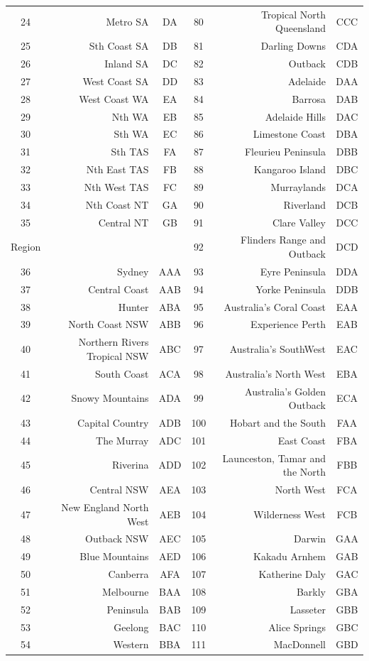 \documentclass[11pt,a4paper,]{article}
\begin{document}
\begin{table}
\begin{tabular}[t]{crccrc}
24 & Metro SA & DA & 80 & Tropical North Queensland & CCC\\
25 & Sth Coast SA & DB & 81 & Darling Downs & CDA\\
26 & Inland SA & DC & 82 & Outback & CDB\\
27 & West Coast SA & DD & 83 & Adelaide & DAA\\
28 & West Coast WA & EA & 84 & Barrosa & DAB\\
29 & Nth WA & EB & 85 & Adelaide Hills & DAC\\
30 & Sth WA & EC & 86 & Limestone Coast & DBA\\
31 & Sth TAS & FA & 87 & Fleurieu Peninsula & DBB\\
32 & Nth East TAS & FB & 88 & Kangaroo Island & DBC\\
33 & Nth West TAS & FC & 89 & Murraylands & DCA\\
34 & Nth Coast NT & GA & 90 & Riverland & DCB\\
35 & Central NT & GB & 91 & Clare Valley & DCC\\
Region &  &  & 92 & Flinders Range and Outback & DCD\\
36 & Sydney & AAA & 93 & Eyre Peninsula & DDA\\
37 & Central Coast & AAB & 94 & Yorke Peninsula & DDB\\
38 & Hunter & ABA & 95 & Australia's Coral Coast & EAA\\
39 & North Coast NSW & ABB & 96 & Experience Perth & EAB\\
40 & Northern Rivers Tropical NSW & ABC & 97 & Australia's SouthWest & EAC\\
41 & South Coast & ACA & 98 & Australia's North West & EBA\\
42 & Snowy Mountains & ADA & 99 & Australia's Golden Outback & ECA\\
43 & Capital Country & ADB & 100 & Hobart and the South & FAA\\
44 & The Murray & ADC & 101 & East Coast & FBA\\
45 & Riverina & ADD & 102 & Launceston, Tamar and the North & FBB\\
46 & Central NSW & AEA & 103 & North West & FCA\\
47 & New England North West & AEB & 104 & Wilderness West & FCB\\
48 & Outback NSW & AEC & 105 & Darwin & GAA\\
49 & Blue Mountains & AED & 106 & Kakadu Arnhem & GAB\\
50 & Canberra & AFA & 107 & Katherine Daly & GAC\\
51 & Melbourne & BAA & 108 & Barkly & GBA\\
52 & Peninsula & BAB & 109 & Lasseter & GBB\\
53 & Geelong & BAC & 110 & Alice Springs & GBC\\
54 & Western & BBA & 111 & MacDonnell & GBD\\
\bottomrule
\end{tabular}
\end{table}
\end{document}
